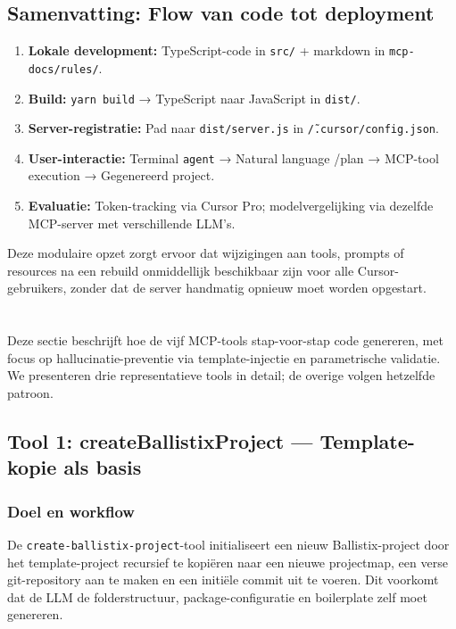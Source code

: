 \subsection{Samenvatting: Flow van code tot deployment}

\begin{enumerate}
  \item \textbf{Lokale development:} TypeScript-code in \texttt{src/} + markdown in \texttt{mcp-docs/rules/}.
  \item \textbf{Build:} \texttt{yarn build} → TypeScript naar JavaScript in \texttt{dist/}.
  \item \textbf{Server-registratie:} Pad naar \texttt{dist/server.js} in \texttt{\~/.cursor/config.json}.
  \item \textbf{User-interactie:} Terminal \texttt{agent} → Natural language /plan → MCP-tool execution → Gegenereerd project.
  \item \textbf{Evaluatie:} Token-tracking via Cursor Pro; modelvergelijking via dezelfde MCP-server met verschillende LLM's.
\end{enumerate}

Deze modulaire opzet zorgt ervoor dat wijzigingen aan tools, prompts of resources na een rebuild onmiddellijk beschikbaar zijn voor alle Cursor-gebruikers, zonder dat de server handmatig opnieuw moet worden opgestart.

\section{}
\label{sec:poc-tools}

Deze sectie beschrijft hoe de vijf MCP-tools stap-voor-stap code genereren, met focus op hallucinatie-preventie via template-injectie en parametrische validatie. We presenteren drie representatieve tools in detail; de overige volgen hetzelfde patroon.

\subsection{Tool 1: createBallistixProject — Template-kopie als basis}

\subsubsection{Doel en workflow}

De \texttt{create-ballistix-project}-tool initialiseert een nieuw Ballistix-project door het template-project recursief te kopiëren naar een nieuwe projectmap, een verse git-repository aan te maken en een initiële commit uit te voeren. Dit voorkomt dat de LLM de folderstructuur, package-configuratie en boilerplate zelf moet genereren.

